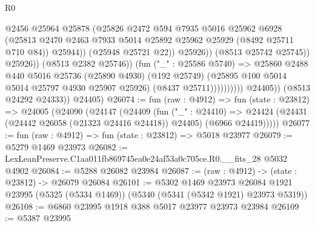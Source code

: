 \begin{lexlean}{R0}
\begin{coremodule}
                                            @2456
                                            @25964
                                            @25878
                                            (@25826
                                              @2472
                                              @594
                                              @7935
                                              @5016
                                              @25962
                                              @6928
                                              (@25813
                                                @2470
                                                @2463
                                                @7933
                                                @5014
                                                @25892
                                                @25962
                                                @25929
                                                (@8492 @25711 @710 @84))
                                              @25944))
                                          (@25948 @25721 @22))
                                        @25926))
                                    (@8513 @25742 @25745))
                                  @25926))
                              (@8513 @2382 @25746))
                            (fun ("_" : @25586 @5740) =>
                            @25860
                              @2488
                              @440
                              @5016
                              @25736
                              (@25890 @4930)
                              (@192 @25749)
                              (@25895 @100 @5014 @5014 @25797 @4930 @25907 @25926)
                              (@8437 @25711))))))))))
            @24405))
        (@8513 @24292 @24333))
      @24405)
@26074 := fun (raw : @4912) =>
  fun (state : @23812) =>
  @24005
    (@24090
      (@24147
        (@24409
          (fun ("_" : @24410) =>
          @24424 (@24431 (@24442 @26058 (@21323 @24416 @24418)) @24405) (@6966 @24419)))))
@26077 := fun (raw : @4912) => fun (state : @23812) => @5018 @23977
@26079 := @5279 @1469 @23973
@26082 := LexLeanPreserve.C1aa011fb869745ea0e24af53a0c705ce.R0.__fits_28 @5032 @4902
@26084 := @5288 @26082 @23984
@26087 := (raw : @4912) -> (state : @23812) -> @26079 @26084
@26101 := @5302
    @1469
    @23973
    @26084
    @1921
    @23995
    (@5325 (@5334 @1469))
    (@5340 (@5341 (@5342 @1921) @23973 @5319))
@26108 := @6860 @23995 @1918 @388 @5017 @23977 @23973 @23984
@26109 := @5387 @23995

\end{coremodule}
\end{lexlean}

